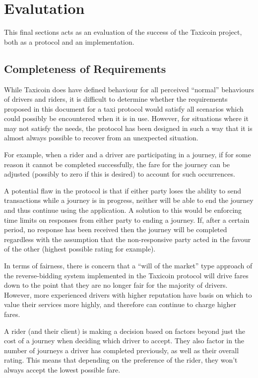 \section{Evalutation}

This final sections acts as an evaluation of the success of the Taxicoin project, both as a protocol and an implementation.

\subsection{Completeness of Requirements}

While Taxicoin does have defined behaviour for all perceived \enquote{normal} behaviours of drivers and riders, it is difficult to determine whether the requirements proposed in this document for a taxi protocol would satisfy all scenarios which could possibly be encountered when it is in use. However, for situations where it may not satisfy the needs, the protocol has been designed in such a way that it is almost always possible to recover from an unexpected situation.

For example, when a rider and a driver are participating in a journey, if for some reason it cannot be completed successfully, the fare for the journey can be adjusted (possibly to zero if this is desired) to account for such occurrences.

A potential flaw in the protocol is that if either party loses the ability to send transactions while a journey is in progress, neither will be able to end the journey and thus continue using the application. A solution to this would be enforcing time limits on responses from either party to ending a journey. If, after a certain period, no response has been received then the journey will be completed regardless with the assumption that the non-responsive party acted in the favour of the other (highest possible rating for example).

In terms of fairness, there is concern that a \enquote{will of the market} type approach of the reverse-bidding system implemented in the Taxicoin protocol will drive fares down to the point that they are no longer fair for the majority of drivers. However, more experienced drivers with higher reputation have basis on which to value their services more highly, and therefore can continue to charge higher fares.

A rider (and their client) is making a decision based on factors beyond just the cost of a journey when deciding which driver to accept. They also factor in the number of journeys a driver has completed previously, as well as their overall rating. This means that depending on the preference of the rider, they won't always accept the lowest possible fare.

